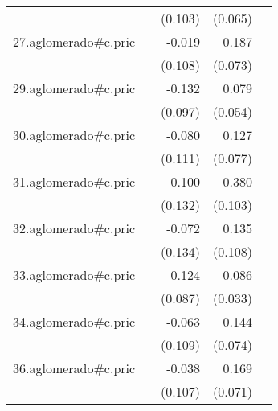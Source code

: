 {\begin{longtable}{l*{4}{D{.}{.}{-1}}}
            &                     &     (0.103)         &     (0.065)         &                     \\
\addlinespace
27.aglomerado#c.pric&                     &      -0.019         &       0.187\sym{*}  &                     \\
            &                     &     (0.108)         &     (0.073)         &                     \\
\addlinespace
29.aglomerado#c.pric&                     &      -0.132         &       0.079         &                     \\
            &                     &     (0.097)         &     (0.054)         &                     \\
\addlinespace
30.aglomerado#c.pric&                     &      -0.080         &       0.127         &                     \\
            &                     &     (0.111)         &     (0.077)         &                     \\
\addlinespace
31.aglomerado#c.pric&                     &       0.100         &       0.380\sym{***}&                     \\
            &                     &     (0.132)         &     (0.103)         &                     \\
\addlinespace
32.aglomerado#c.pric&                     &      -0.072         &       0.135         &                     \\
            &                     &     (0.134)         &     (0.108)         &                     \\
\addlinespace
33.aglomerado#c.pric&                     &      -0.124         &       0.086\sym{**} &                     \\
            &                     &     (0.087)         &     (0.033)         &                     \\
\addlinespace
34.aglomerado#c.pric&                     &      -0.063         &       0.144         &                     \\
            &                     &     (0.109)         &     (0.074)         &                     \\
\addlinespace
36.aglomerado#c.pric&                     &      -0.038         &       0.169\sym{*}  &                     \\
            &                     &     (0.107)         &     (0.071)         &                     \\

\end{longtable}}
